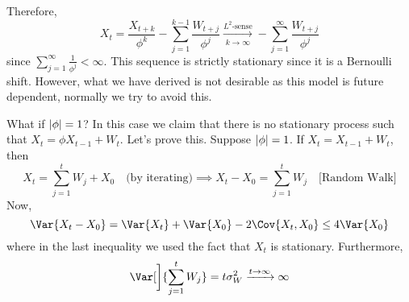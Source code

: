 Therefore,
\[ X_t=\frac{X_{t+k}}{\phi^k} -\sum_{j=1}^{k-1} \frac{W_{t+j}}{\phi^j}
    \xrightarrow[k\to\infty]{L^2\text{-sense}}-\sum_{j=1}^{\infty} \frac{W_{t+j}}{\phi^j}   \]
since $ \displaystyle \sum_{j=1}^{\infty} \frac{1}{\phi^j} <\infty $.
This sequence is strictly stationary since it is a Bernoulli shift.
However, what we have derived is not desirable as this model is
future dependent, normally we try to avoid this.

What if $ \lvert\phi\rvert=1 $? In this case we claim that
there is no stationary process such that $ X_t=\phi X_{t-1}+W_t $. Let's prove this.
Suppose $ \lvert\phi\rvert=1 $. If $ X_t=X_{t-1}+W_{t} $, then
\[ X_t=\sum_{j=1}^{t} W_j+X_0\quad\text{(by iterating)}
    \implies X_t-X_0=\sum_{j=1}^{t} W_j\quad\text{[Random Walk]} \]
Now,
\[ \Var{X_t-X_0}=\Var{X_t}+\Var{X_0}-2\Cov{X_t,X_0}\le 4\Var{X_0} \]
where in the last inequality we used the fact that $ X_t $ is stationary.
Furthermore,
\[ \Var[\bigg]{\sum_{j=1}^{t} W_j}=t\sigma_W^2\xrightarrow{t\to\infty}\infty \]
